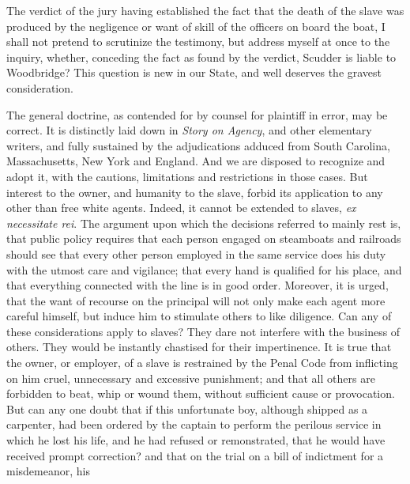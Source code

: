 \documentclass[
  letterpaper,
  11pt,
  DIV=9,
  openright]{scrbook}
\begin{document}

The verdict of the jury having established the fact that the death of
the slave was produced by the negligence or want of skill of the
officers on board the boat, I shall not pretend to scrutinize the
testimony, but address myself at once to the inquiry, whether, conceding
the fact as found by the verdict, Scudder is liable to Woodbridge? This
question is new in our State, and well deserves the gravest
consideration.

The general doctrine, as contended for by counsel for plaintiff in
error, may be correct. It is distinctly laid down in \emph{Story on
Agency}, and other elementary writers, and fully sustained by the
adjudications adduced from South Carolina, Massachusetts, New York and
England. And we are disposed to recognize and adopt it, with the
cautions, limitations and restrictions in those cases. But interest to
the owner, and humanity to the slave, forbid its application to any
other than free white agents. Indeed, it cannot be extended to slaves,
\emph{ex necessitate rei}. The argument upon which the decisions
referred to mainly rest is, that public policy requires that each person
engaged on steamboats and railroads should see that every other person
employed in the same service does his duty with the utmost care and
vigilance; that every hand is qualified for his place, and that
everything connected with the line is in good order. Moreover, it is
urged, that the want of recourse on the principal will not only make
each agent more careful himself, but induce him to stimulate others to
like diligence. Can any of these considerations apply to slaves? They
dare not interfere with the business of others. They would be instantly
chastised for their impertinence. It is true that the owner, or
employer, of a slave is restrained by the Penal Code from inflicting on
him cruel, unnecessary and excessive punishment; and that all others are
forbidden to beat, whip or wound them, without sufficient cause or
provocation. But can any one doubt that if this unfortunate boy,
although shipped as a carpenter, had been ordered by the captain to
perform the perilous service in which he lost his life, and he had
refused or remonstrated, that he would have received prompt correction?
and that on the trial on a bill of indictment for a misdemeanor, his
\end{document}
